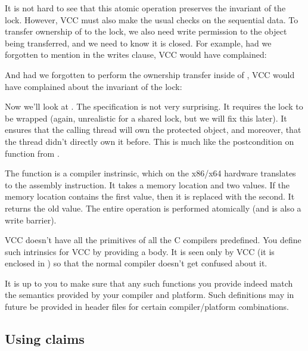 It is not hard to see that this atomic operation preserves the
invariant of the lock.
However, VCC must also make the usual checks on the sequential data.
To transfer ownership of  to the lock, we also need
write permission to the object being transferred, and
we need to know it is closed.
For example, had we forgotten to mention 
in the writes clause,  VCC would have complained:


\noindent
And had we forgotten to perform the ownership transfer inside of
, VCC would have complained
about the invariant of the lock:


Now we'll look at . 
The specification is not very surprising. It requires the lock to be
wrapped (again, unrealistic for a shared lock, but we will fix this later).
It ensures that the calling thread will own the protected object,
and moreover, that the thread didn't directly own it before.
This is much like the postcondition on  function
from .


\noindent
The  function is a compiler instrinsic,
which on the x86/x64 hardware translates to the  assembly instruction.
It takes a memory location and two values.
If the memory location contains the first value, then it is replaced with the second.
It returns the old value.
The entire operation is performed atomically (and is also a write barrier).

VCC doesn't have all the primitives of all the C compilers predefined.
You define such intrinsics for VCC by providing a body. 
It is seen only by VCC (it is enclosed in
) so that the normal compiler doesn't get confused
about it.


\noindent
It is up to you to make sure that any such functions you provide
indeed match the semantics provided by your compiler and platform. 
Such definitions may in future be provided in header files for certain compiler/platform
combinations.


\subsection{Using claims}
\label{sect:using-claims}

